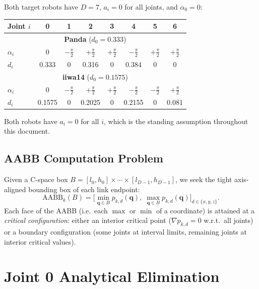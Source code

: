 \documentclass[11pt,a4paper]{article}
\newcommand{\AABB}{\mathrm{AABB}}
\newcommand{\bq}{\mathbf{q}}
\begin{document}
Both target robots have $D = 7$, $a_i = 0$ for all joints,
and $\alpha_0 = 0$:
\begin{center}
\begin{tabular}{l|ccccccc}
\toprule
Joint $i$ & 0 & 1 & 2 & 3 & 4 & 5 & 6 \\
\midrule
\multicolumn{8}{c}{\textbf{Panda} ($d_0 = 0.333$)} \\
$\alpha_i$ & $0$ & $-\frac\pi2$ & $+\frac\pi2$ & $+\frac\pi2$ & $-\frac\pi2$ & $+\frac\pi2$ & $+\frac\pi2$ \\
$d_i$      & 0.333 & 0 & 0.316 & 0 & 0.384 & 0 & 0 \\
\midrule
\multicolumn{8}{c}{\textbf{iiwa14} ($d_0 = 0.1575$)} \\
$\alpha_i$ & $0$ & $-\frac\pi2$ & $+\frac\pi2$ & $+\frac\pi2$ & $-\frac\pi2$ & $-\frac\pi2$ & $+\frac\pi2$ \\
$d_i$      & 0.1575 & 0 & 0.2025 & 0 & 0.2155 & 0 & 0.081 \\
\bottomrule
\end{tabular}
\end{center}
Both robots have $a_i = 0$ for all $i$, which is the standing assumption
throughout this document.

\subsection{AABB Computation Problem}

Given a C-space box $B = [l_0,h_0]\times\cdots\times[l_{D-1},h_{D-1}]$, we seek the
tight axis-aligned bounding box of each link endpoint:
\begin{equation}\label{eq:aabb_target}
  \AABB_k(B) = \biggl[
    \min_{\bq \in B} p_{k,d}(\bq),\;
    \max_{\bq \in B} p_{k,d}(\bq)
  \biggr]_{d \in \{x,y,z\}}.
\end{equation}
Each face of the AABB (i.e.\ each $\max$ or $\min$ of a coordinate) is
attained at a \emph{critical configuration}: either an interior critical
point ($\nabla p_{k,d} = 0$ w.r.t.\ all joints) or a boundary
configuration (some joints at interval limits, remaining joints at
interior critical values).


\section{Joint 0 Analytical Elimination}\label{sec:q0}
\end{document}
